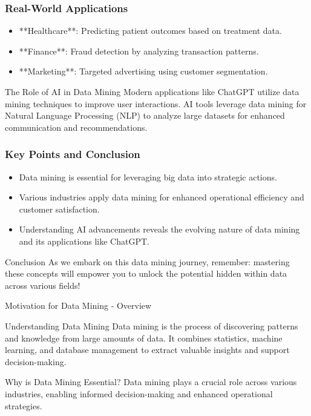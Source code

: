 \documentclass[aspectratio=169]{beamer}
\begin{document}
\begin{frame}[fragile]
    \frametitle{Real-World Applications}
    \begin{itemize}
        \item **Healthcare**: Predicting patient outcomes based on treatment data.
        \item **Finance**: Fraud detection by analyzing transaction patterns.
        \item **Marketing**: Targeted advertising using customer segmentation.
    \end{itemize}
    
    \begin{block}{The Role of AI in Data Mining}
        Modern applications like ChatGPT utilize data mining techniques to improve user interactions. AI tools leverage data mining for Natural Language Processing (NLP) to analyze large datasets for enhanced communication and recommendations.
    \end{block}
\end{frame}

\begin{frame}[fragile]
    \frametitle{Key Points and Conclusion}
    \begin{itemize}
        \item Data mining is essential for leveraging big data into strategic actions.
        \item Various industries apply data mining for enhanced operational efficiency and customer satisfaction.
        \item Understanding AI advancements reveals the evolving nature of data mining and its applications like ChatGPT.
    \end{itemize}

    \begin{block}{Conclusion}
        As we embark on this data mining journey, remember: mastering these concepts will empower you to unlock the potential hidden within data across various fields!
    \end{block}
\end{frame}

\begin{frame}[fragile]{Motivation for Data Mining - Overview}
    \begin{block}{Understanding Data Mining}
        Data mining is the process of discovering patterns and knowledge from large amounts of data. It combines statistics, machine learning, and database management to extract valuable insights and support decision-making.
    \end{block}
    
    \begin{block}{Why is Data Mining Essential?}
        Data mining plays a crucial role across various industries, enabling informed decision-making and enhanced operational strategies.
    \end{block}
\end{frame}
\end{document}

